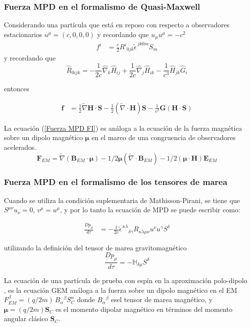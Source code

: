 \documentclass[aspectratio=169,10pt,usenames,dvipsnames,spanish]{beamer}
\newcommand{\ve}[1]{\mathbf{#1}}    %
\newcommand{\vg}[1]{\boldsymbol{#1}}   %
\begin{document}
\begin{frame}
\frametitle{Fuerza MPD en el formalismo de Quasi-Maxwell}

Considerando una partícula que está en reposo con respecto a observadores estacionarios $u^\mu=(c,0,0,0)$ y recordando que $u_{\mu}u^{\mu}=-c^2$
\begin{align}
    \nonumber f^i&=\frac{c}{2}R^i{}_{0jk}\tilde{\epsilon}^{\,jk0m} S_m
\end{align}
y recordando que
\begin{equation}
	\hat{R}_{0ijk}=-\frac{1}{2c}\hat{\nabla}_k\hat{H}_{ij}+\frac{1}{2c}\hat{\nabla}_j\hat{H}_{ik}-\frac{1}{c^3}\hat{H}_{jk}\hat{G}_i
\end{equation}

entonces

\begin{align}\label{Fuerza MPD FI}
    \ve{f}&=\frac{1}{2}\tilde{\nabla}\ve{H}\cdot \ve{S}-\frac{1}{2}(\tilde{\nabla}\cdot \ve{H})\ve{S}-\frac{1}{c^2}\ve{G}(\ve{H}\cdot \ve{S})
\end{align}

La ecuación (\ref{Fuerza MPD FI}) es análoga a la ecuación de la fuerza magnética sobre un dipolo magnético $\vg{\mu}$ en el marco de una congruencia de observadores acelerados.
\begin{equation}\label{FuerzaDipolo FI}
	\mathbf{F}_{EM}=\tilde{\nabla}(\ve{B}_{EM}\cdot \vg{\mu})-1/2 \vg{\mu}(\tilde{\nabla}\cdot \ve{B}_{EM})-1/2(\vg{\mu}\cdot\ve{H})\ve{E}_{EM}
\end{equation}
\end{frame}


\begin{frame}
\frametitle{Fuerza MPD en el formalismo de los tensores de marea}

Cuando se utiliza la condición suplementaria de Mathisson-Pirani, se tiene que $S^{\mu\nu}u_{\nu}=0$, $v^{\mu}=u^{\mu}$, y por lo tanto la ecuación de MPD se puede escribir como:

\begin{align*}
    \frac{D p_{\mu}}{d\tau}&=-\frac{1}{2c}\tilde{\epsilon}^{\,\kappa \lambda}{}_{\delta\gamma} R_{\kappa\lambda\mu\nu}u^{\nu} u^{\gamma}S^{\delta}
\end{align*}

utilizando la definición del tensor de marea gravitomagnético
\begin{equation}\label{FuerzaTensorMarea}
    \frac{D p_{\mu}}{d\tau}=-\mathbb{H}_{\delta\mu}S^{\delta}
\end{equation}

La ecuación de una partícula de prueba con espín en la aproximación polo-dipolo \cite{Papapetrou1951}, es la ecuación GEM análoga a la fuerza sobre un dipolo magnético en el EM $F^{\beta}_{EM}=(q/2m)\, B_{\alpha}{}^{\beta} S_C^{\alpha}$ donde $B_{\alpha}{}^{\beta}$ esel tensor de marea magnético, y $\vg{\mu}=(q/2m)\ve{S}_C$ es el momento dipolar magnético en términos del momento angular clásico $\ve{S}_C$.

\end{frame}
\end{document}
